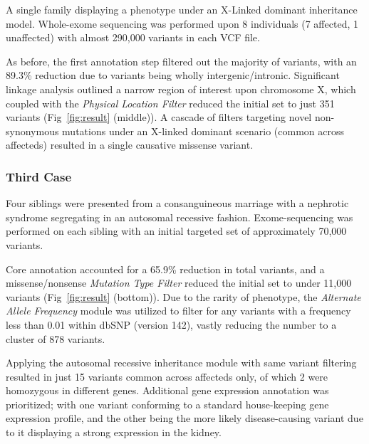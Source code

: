 \documentclass{bioinfo}
\begin{document}
A single family displaying a phenotype under an X-Linked dominant inheritance model. Whole-exome sequencing was performed upon 8 individuals (7 affected, 1 unaffected) with almost 290,000 variants in each VCF file. 

As before, the first annotation step filtered out the majority of variants, with an 89.3\% reduction due to variants being wholly intergenic/intronic. Significant linkage analysis outlined a narrow region of interest upon chromosome X, which coupled with the \textit{Physical Location Filter} reduced the initial set to just 351 variants (Fig~\ref{fig:result} (middle)). A cascade of filters targeting novel non-synonymous mutations under an X-linked dominant scenario (common across affecteds) resulted in a single causative missense variant.


\subsubsection{Third Case}

Four siblings were presented from a consanguineous marriage with a nephrotic syndrome segregating in an autosomal recessive fashion. Exome-sequencing was performed on each sibling with an initial targeted set of approximately 70,000 variants.

Core annotation accounted for a 65.9\% reduction in total variants, and a missense/nonsense \textit{Mutation Type Filter} reduced the initial set to under 11,000 variants (Fig~\ref{fig:result} (bottom)). Due to the rarity of phenotype, the \textit{Alternate Allele Frequency} module was utilized  to filter for any variants with a frequency less than 0.01 within dbSNP (version 142), vastly reducing the number to a cluster of 878 variants.

Applying the autosomal recessive inheritance module with same variant filtering resulted in just 15 variants common across affecteds only, of which 2 were homozygous in different genes. Additional gene expression annotation was prioritized; with one variant conforming to a standard house-keeping gene expression profile, and the other being the more likely disease-causing variant due to it displaying a strong expression in the kidney.


\end{document}
